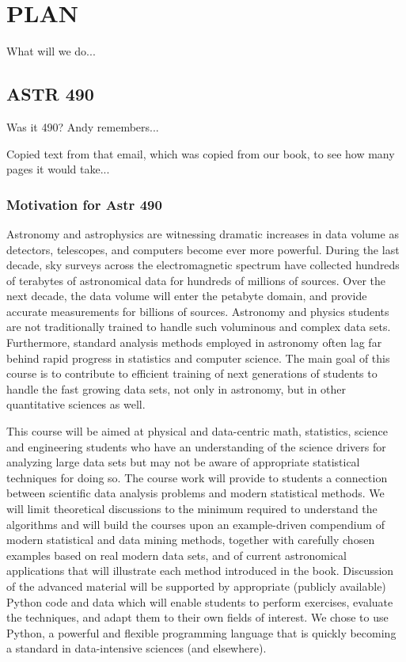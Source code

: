 \section{{\bf PLAN}}
What will we do...





\subsection{ASTR 490} 

Was it 490? Andy remembers...


Copied text from that email, which was copied from our book, to see
how many pages it would take...

\subsubsection{Motivation for Astr 490}

Astronomy and astrophysics are witnessing dramatic increases in data volume 
as detectors, telescopes, and computers become ever more powerful. During the 
last decade, sky surveys across the electromagnetic spectrum have collected 
hundreds of terabytes of astronomical data for hundreds of millions of sources. 
Over the next decade, the data volume will enter the petabyte domain, and provide 
accurate measurements for billions of sources. Astronomy and physics students 
are not traditionally trained to handle such voluminous and complex data sets. 
Furthermore, standard analysis methods employed in astronomy often lag far 
behind rapid progress in statistics and computer science. The main
goal of this course is to contribute to efficient training of next
generations of students to 
handle the fast growing data sets, not only in astronomy, but in other quantitative 
sciences as well. 

This course will be aimed at physical and data-centric math,
statistics, science and engineering students
who have an understanding of the science drivers for analyzing large data sets but 
may not be aware of appropriate statistical techniques for doing so. The course work 
will provide to students a connection between scientific data analysis problems and 
modern statistical methods. We will limit theoretical discussions to the minimum 
required to understand the algorithms and will build the courses upon an 
example-driven compendium of modern statistical and data mining methods, 
together with carefully chosen examples based on real modern data sets, and of 
current astronomical applications that will illustrate each method introduced in the 
book. Discussion of the advanced material will be supported by appropriate (publicly 
available) Python code and data which will enable students to perform exercises, 
evaluate the techniques, and adapt them to their own fields of interest. We chose to 
use Python, a powerful and flexible programming language that is quickly becoming 
a standard in data-intensive sciences (and elsewhere). 

